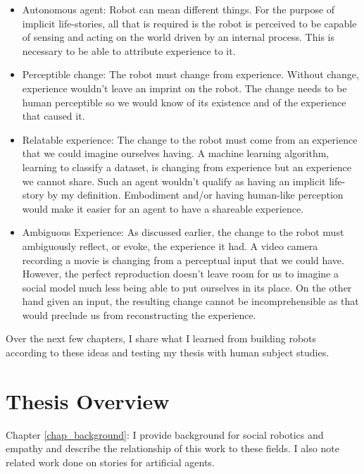 \begin{itemize}
\item Autonomous agent: Robot can mean different things. For the purpose of implicit life-stories, all that is required is the robot is perceived to be capable of sensing and acting on the world driven by an internal process. This is necessary to be able to attribute experience to it. 
\item Perceptible change: The robot must change from experience. Without change, experience wouldn't leave an imprint on the robot. The change needs to be human perceptible so we would know of its existence and of the experience that caused it.
\item Relatable experience: The change to the robot must come from an experience that we could imagine ourselves having. A machine learning algorithm, learning to classify a dataset, is changing from experience but an experience we cannot share. Such an agent wouldn't qualify as having an implicit life-story by my definition. Embodiment and/or having human-like perception would make it easier for an agent to have a shareable experience.
\item Ambiguous Experience: As discussed earlier, the change to the robot must ambiguously reflect, or evoke, the experience it had. A video camera recording a movie is changing from a perceptual input that we could have. However, the perfect reproduction doesn't leave room for us to imagine a social model much less being able to put ourselves in its place. On the other hand given an input, the resulting change cannot be incomprehensible as that would preclude us from reconstructing the experience. 
\end{itemize}


Over the next few chapters, I share what I learned from building robots according to these ideas and testing my thesis with human subject studies. 


\section{Thesis Overview}

\hspace{7pt} Chapter \ref{chap_background}: I provide background for social robotics and empathy and describe the relationship of this work to these fields. I also note related work done on stories for artificial agents.

